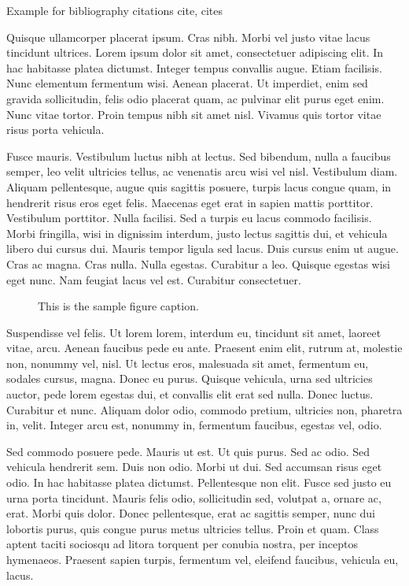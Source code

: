 \documentclass[AMA]{WileyNJD-v1}
\begin{document}
Example for bibliography citations cite\cite{Taylor499}, cites\cites{Knupp-Winslow_smoothing_2D_unstruct-EwC-99,ka00}

Quisque ullamcorper placerat ipsum. Cras nibh.\cites{Kucharik-Shashkov-Wendroff-JCP-paper-03,Blanchard-Loubere-MOOD_remap-techrep-15} Morbi vel justo vitae lacus tincidunt ultrices. Lorem ipsum dolor sit
amet, consectetuer adipiscing elit. In hac habitasse platea dictumst. Integer tempus convallis augue. Etiam facilisis.
Nunc elementum fermentum wisi. Aenean placerat. Ut imperdiet, enim sed gravida sollicitudin, felis odio placerat
quam, ac pulvinar elit purus eget enim. Nunc vitae tortor. Proin tempus nibh sit amet nisl. Vivamus quis tortor
vitae risus porta vehicula.

Fusce mauris. Vestibulum luctus nibh at lectus. Sed bibendum, nulla a faucibus semper, leo velit ultricies tellus, ac
venenatis arcu wisi vel nisl. Vestibulum diam. Aliquam pellentesque, augue quis sagittis posuere, turpis lacus congue
quam, in hendrerit risus eros eget felis. Maecenas eget erat in sapien mattis porttitor. Vestibulum porttitor. Nulla facilisi. Sed a turpis eu lacus commodo facilisis. Morbi fringilla, wisi in dignissim interdum, justo lectus sagittis dui, et
vehicula libero dui cursus dui. Mauris tempor ligula sed lacus. Duis cursus enim ut augue. Cras ac magna. Cras nulla.
Nulla egestas. Curabitur a leo. Quisque egestas wisi eget nunc. Nam feugiat lacus vel est. Curabitur consectetuer.


\begin{figure}[t]
\caption{This is the sample figure caption.\label{fig1}}
\end{figure}

Suspendisse vel felis. Ut lorem lorem, interdum eu, tincidunt sit amet, laoreet vitae, arcu. Aenean faucibus pede eu
ante. Praesent enim elit, rutrum at, molestie non, nonummy vel, nisl. Ut lectus eros, malesuada sit amet, fermentum
eu, sodales cursus, magna. Donec eu purus. Quisque vehicula, urna sed ultricies auctor, pede lorem egestas dui, et
convallis elit erat sed nulla. Donec luctus. Curabitur et nunc. Aliquam dolor odio, commodo pretium, ultricies non,
pharetra in, velit. Integer arcu est, nonummy in, fermentum faucibus, egestas vel, odio.

Sed commodo posuere pede. Mauris ut est. Ut quis purus. Sed ac odio. Sed vehicula hendrerit sem. Duis non
odio. Morbi ut dui. Sed accumsan risus eget odio. In hac habitasse platea dictumst. Pellentesque non elit. Fusce
sed justo eu urna porta tincidunt. Mauris felis odio, sollicitudin sed, volutpat a, ornare ac, erat. Morbi quis dolor.
Donec pellentesque, erat ac sagittis semper, nunc dui lobortis purus, quis congue purus metus ultricies tellus. Proin
et quam. Class aptent taciti sociosqu ad litora torquent per conubia nostra, per inceptos hymenaeos. Praesent sapien
turpis, fermentum vel, eleifend faucibus, vehicula eu, lacus.
\end{document}
